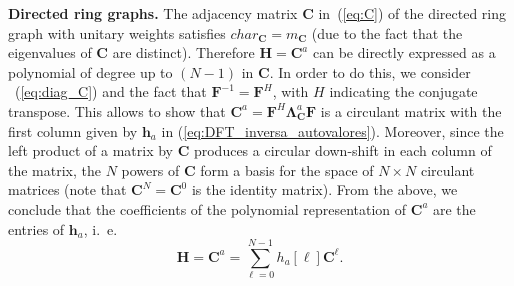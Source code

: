 \vspace{0.25cm}
\noindent\textbf{Directed ring graphs.} The adjacency matrix $ \mathbf{C} $ in~(\ref{eq:C}) of the directed ring graph with unitary weights satisfies $ char_\mathbf{C} = m_\mathbf{C} $ (due to the fact that the eigenvalues of  $\mathbf{C}$ are distinct). Therefore $ \mathbf{H} = \mathbf{C}^a $ can be directly expressed as a polynomial of degree up to  $(N-1)$ in $ \mathbf{C} $. In order to do this, we consider ~(\ref{eq:diag_C}) and the fact that $ \mathbf{F}^{-1} = \mathbf{F}^H $, with $ H $ indicating the conjugate transpose. This allows to show that  $ \mathbf{C}^a = \mathbf{F}^{H} \mathbf{\Lambda}^a_{\mathbf{C}} \mathbf{F}$ is a circulant matrix with the first column given by $ \mathbf{h}_a $ in (\ref{eq:DFT_inversa_autovalores}). Moreover, since the left product of a matrix by $\mathbf{C}$ produces a circular down-shift in each column of the matrix, the $ N $ powers of $\mathbf{C}$ form a basis for the space of $N\times N $ circulant matrices (note that $\mathbf{C}^N =  \mathbf{C}^0$ is the identity matrix). From the above, we conclude that the coefficients of the polynomial representation of $ \mathbf{C}^a $ are the entries of $ \mathbf{h}_a $, i.~e.
\begin{equation}\label{eq:poly_C}
    \mathbf{H} = \mathbf{C}^a = \sum_{\ell=0}^{N-1} h_a[\ell] \mathbf{C}^\ell.
\end{equation}


